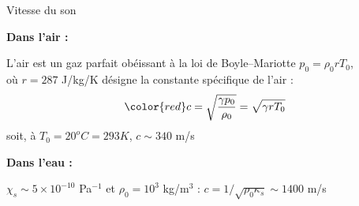 \begin{frame}{Vitesse du son}

\small





\textbf{Dans l'air :}  \medskip

L'air est un gaz parfait obéissant à la loi de Boyle--Mariotte $p_0 = \rho_0 r T_0$, \\ où $r = 287$ J/kg/K désigne la constante spécifique de l'air :
\[
	\color{red} c = \sqrt{\dfrac{\gamma p_0}{\rho_0}} = \sqrt{\gamma r T_0}
\]
soit, à $T_0 = 20 ^o  C  = 293 K$, {\color{vert} $c \sim 340$ m/s}

\bigskip \pause

\textbf{Dans l'eau :} \medskip

$\chi_s \sim 5 \times 10^{-10}$ Pa$^{-1}$ et $\rho_0 = 10^3$ kg/m$^3$ : 
{\color{vert} $c = 1/\sqrt{\rho_0 \kappa_s} \sim 1400$ m/s}

\vspace{0mm}

\end{frame}


